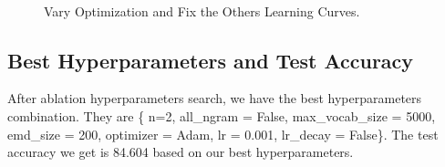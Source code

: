 \documentclass[10pt,a4paper]{article}
\begin{document}
\begin{figure}[!ht]
{}		\\
\caption{\label{fig:optim}Vary Optimization and Fix the Others Learning Curves.}
\end{figure}
\subsection{Best Hyperparameters and Test Accuracy}
After ablation hyperparameters search, we have the best hyperparameters combination. They are \{ n=2, all\_ngram = False, max\_vocab\_size = 5000, emd\_size = 200, optimizer = Adam, lr = 0.001, lr\_decay = False\}. The test accuracy we get is 84.604 based on our best hyperparameters.
\end{document}
